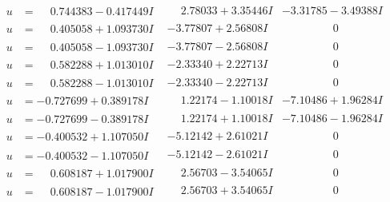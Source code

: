 \documentclass[1p]{elsarticle_modified}
\theoremstyle{definition}
\begin{document}
$$\begin{array}{c|c|c}
\begin{aligned}
u &= \phantom{-}0.744383 - 0.417449 I\end{aligned}
 & \phantom{-}2.78033 + 3.35446 I & -3.31785 - 3.49388 I \\ \hline\begin{aligned}
u &= \phantom{-}0.405058 + 1.093730 I\end{aligned}
 & -3.77807 + 2.56808 I & \phantom{-0.000000 } 0 \\ \hline\begin{aligned}
u &= \phantom{-}0.405058 - 1.093730 I\end{aligned}
 & -3.77807 - 2.56808 I & \phantom{-0.000000 } 0 \\ \hline\begin{aligned}
u &= \phantom{-}0.582288 + 1.013010 I\end{aligned}
 & -2.33340 + 2.22713 I & \phantom{-0.000000 } 0 \\ \hline\begin{aligned}
u &= \phantom{-}0.582288 - 1.013010 I\end{aligned}
 & -2.33340 - 2.22713 I & \phantom{-0.000000 } 0 \\ \hline\begin{aligned}
u &= -0.727699 + 0.389178 I\end{aligned}
 & \phantom{-}1.22174 - 1.10018 I & -7.10486 + 1.96284 I \\ \hline\begin{aligned}
u &= -0.727699 - 0.389178 I\end{aligned}
 & \phantom{-}1.22174 + 1.10018 I & -7.10486 - 1.96284 I \\ \hline\begin{aligned}
u &= -0.400532 + 1.107050 I\end{aligned}
 & -5.12142 + 2.61021 I & \phantom{-0.000000 } 0 \\ \hline\begin{aligned}
u &= -0.400532 - 1.107050 I\end{aligned}
 & -5.12142 - 2.61021 I & \phantom{-0.000000 } 0 \\ \hline\begin{aligned}
u &= \phantom{-}0.608187 + 1.017900 I\end{aligned}
 & \phantom{-}2.56703 - 3.54065 I & \phantom{-0.000000 } 0 \\ \hline\begin{aligned}
u &= \phantom{-}0.608187 - 1.017900 I\end{aligned}
 & \phantom{-}2.56703 + 3.54065 I & \phantom{-0.000000 } 0 \\ \hline\begin{aligned}

\end{aligned}
\end{array}$$
\end{document}
